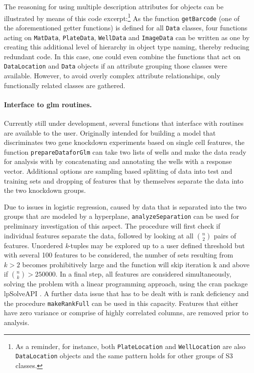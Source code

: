 The reasoning for using multiple description attributes for objects can be illustrated by means of this code excerpt:\footnote{As a reminder, for instance, both \texttt{PlateLocation} and \texttt{WellLocation} are also \texttt{DataLocation} objects and the same pattern holds for other groups of S3 classes.} As the function \texttt{getBarcode} (one of the aforementioned getter functions) is defined for all \texttt{Data} classes, four functions acting on \texttt{MatData}, \texttt{PlateData}, \texttt{WellData} and \texttt{ImageData} can be written as one by creating this additional level of hierarchy in object type naming, thereby reducing redundant code. In this case, one could even combine the functions that act on \texttt{DataLocation} and \texttt{Data} objects if an attribute grouping those classes were available. However, to avoid overly complex attribute relationships, only functionally related classes are gathered.

\paragraph{Interface to \acrshort{glm} routines.}
Currently still under development, several functions that interface with  routines are available to the user. Originally intended for building a model that discriminates two gene knockdown experiments based on single cell features, the function \texttt{prepareDataforGlm} can take two lists of wells and make the data ready for analysis with  by concatenating and annotating the wells with a response vector. Additional options are sampling based splitting of data into test and training sets and dropping of features that by themselves separate the data into the two knockdown groups.

Due to issues in logistic regression, caused by data that is separated into the two groups that are modeled by a hyperplane, \texttt{analyzeSeparation} can be used for preliminary investigation of this aspect. The procedure will first check if individual features separate the data, followed by looking at all $n \choose 2$ pairs of features. Unordered \textit{k}-tuples may be explored up to a user defined threshold but with several 100 features to be considered, the number of sets resulting from $k > 2$ becomes prohibitively large and the function will skip iteration k and above if ${n \choose k} > 250000$. In a final step, all features are considered simultaneously, solving the problem with a linear programming approach, using the \acrshort{cran} package lpSolveAPI \citep{Konis2007}. A further data issue that has to be dealt with is rank deficiency and the procedure \texttt{makeRankFull} can be used in this capacity. Features that either have zero variance or comprise of highly correlated columns, are removed prior to analysis.

